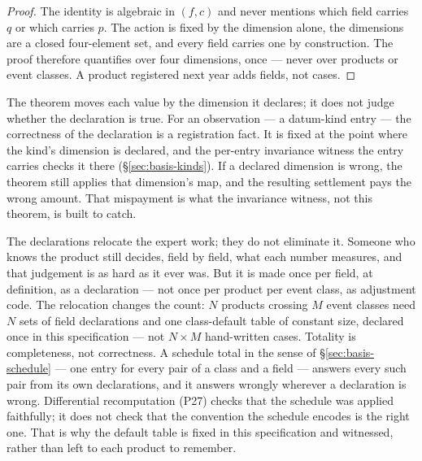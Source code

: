 \begin{proof}
The identity is algebraic in $(f,c)$ and never mentions which field carries
$q$ or which carries $p$. The action is fixed by the dimension alone, the
dimensions are a closed four-element set, and every field carries one by
construction. The proof therefore quantifies over four dimensions, once ---
never over products or event classes. A product registered next year adds
fields, not cases.
\end{proof}

\noindent
The theorem moves each value by the dimension it declares; it does not judge
whether the declaration is true. For an observation --- a datum-kind entry ---
the correctness of the declaration is a registration fact. It is fixed at the
point where the kind's dimension is declared, and the per-entry invariance
witness the entry carries checks it there (\S\ref{sec:basis-kinds}). If a
declared dimension is wrong, the theorem still applies that dimension's map,
and the resulting settlement pays the wrong amount. That mispayment is what
the invariance witness, not this theorem, is built to catch.

The declarations relocate the expert work; they do not eliminate it. Someone
who knows the product still decides, field by field, what each number
measures, and that judgement is as hard as it ever was. But it is made once
per field, at definition, as a declaration --- not once per product per event
class, as adjustment code. The relocation changes the count: $N$ products
crossing $M$ event classes need $N$ sets of field declarations and one
class-default table of constant size, declared once in this specification ---
not $N\times M$ hand-written cases. Totality is completeness, not correctness.
A schedule total in the sense of \S\ref{sec:basis-schedule} --- one entry for
every pair of a class and a field --- answers every such pair from its own
declarations, and it answers wrongly wherever a declaration is wrong.
Differential recomputation (P27) checks that
the schedule was applied faithfully; it does not check that the convention
the schedule encodes is the right one. That is why the default table is fixed
in this specification and witnessed, rather than left to each product to
remember.

